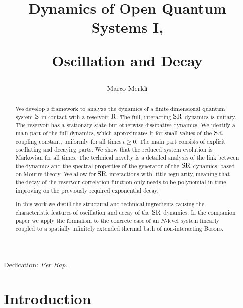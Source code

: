 \documentclass[letterpaper,onecolumn,11pt,accepted=2021-12-09]{quantumarticle}
\numberwithin{equation}{section}
\renewcommand{\r}{{\rm R}}
\newcommand{\s}{{\rm S}}
\begin{document}
	
\title{Dynamics of 	
		Open Quantum Systems I,  
		
		Oscillation and Decay}	
\author{Marco Merkli}
\maketitle

\centerline{\small Dedication: {\em Per Bap.}}

\begin{abstract}
We develop a framework to analyze the dynamics of a finite-dimensional quantum system $\s$ in contact with a reservoir $\r$. The full, interacting $\s\r$ dynamics is unitary. The reservoir has a stationary state but otherwise dissipative dynamics. We identify a main part of the full dynamics, which approximates it for small values of the $\s\r$ coupling constant, uniformly for all times $t\ge 0$. The main part consists of explicit oscillating and decaying parts. We show that the reduced system evolution is Markovian for all times. The technical novelty is a detailed analysis of the link between the dynamics and the spectral properties of the generator of the $\s\r$ dynamics, based on Mourre theory. We allow for $\s\r$ interactions with little regularity, meaning that the decay of the reservoir correlation function only needs to be polynomial in time, improving on the previously required exponential decay.

In this work we distill the structural and technical ingredients causing the characteristic features of oscillation and decay of the $\s\r$ dynamics. In the companion paper \cite{Markov2} we apply the formalism to the concrete case of an $N$-level system linearly coupled to a spatially infinitely extended thermal bath of non-interacting Bosons. 
\end{abstract}





\section{Introduction}
\end{document}
